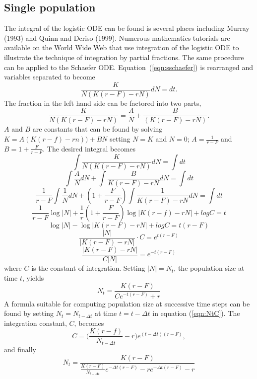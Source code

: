 \subsection{Single population}
The integral of the logistic ODE can be found is several places
including Murray (1993) and Quinn and Deriso (1999).
Numerous mathematics tutorials are available on the World Wide Web
that use
integration of the logistic ODE to illustrate the technique of
integration by partial fractions.
The same procedure can be applied to the Schaefer ODE.
Equation~(\ref{eqn:sschaefer}) is rearranged and variables
separated to become
\begin{equation}
\frac{K}{N(K(r-F)-rN)}dN=dt.
\end{equation}
The fraction in the left hand side can be factored into two parts,
\begin{equation}
\frac{K}{N(K(r-F)-rN)}=\frac{A}{N}+\frac{B}{(K(r-F)-rN)}.
\end{equation}
$A$ and $B$ are constants that can be found by solving
$K=A(K(r-f)-rn))+BN$
setting $N=K$ and $N=0$; 
$A=\frac{1}{r-F}$ and $B=1+\frac{F}{r-F}$.
The desired integral becomes
\[\int\frac{K}{N(K(r-F)-rN)}dN   = \int dt\]
\[\int\frac{A}{N}dN + \int\frac{B}{K(r-F)-rN}dN  = \int dt\]
\[\frac{1}{r-F}\int\frac{1}{N}dN + (1+\frac{F}{r-F})\int\frac{1}{K(r-F)-rN}dN  = \int dt\] 
\[\frac{1}{r-F}\log |N| + \frac{1}{r}(1+\frac{F}{r-F})\log |K(r-f)-rN| +log C  = t\] \[\log |N| - \log |K(r-F)-rN| + log C  = t(r-F)\]
\[\frac{|N|}{|K(r-F)-rN|}\cdot C  =  e^{t(r-F)}\]
\[\frac{|K(r-F)-rN|}{C|N|} =  e^{-t(r-F)}\]
where $C$ is the constant of integration.
Setting $|N| = N_t$, the population size at time $t$, yields
\begin{equation}
\label{eqn:NtC}
N_t=\frac{K(r-F)}{Ce^{-t(r-F)}+r}
\end{equation}
A formula suitable for computing population size at successive
time steps can be found by setting $N_t = N_{t-\Delta t}$ at time
$t=t-\Delta t$ in equation (\ref{eqn:NtC}).
The integration constant, $C$, becomes
\begin{equation}
C=\Bigg(\frac{K(r-f)}{N_{t-\Delta t}}-r\Bigg)e^{(t-\Delta t)(r-F)},
\end{equation}
and finally
\begin{equation}
\label{eqn:intschaefer}
N_t = \frac{K(r-F)}{\frac{K(r-F)}{N_{t-\Delta t}}e^{-\Delta t(r-F)}-re^{-\Delta t(r-F)} -r}
\end{equation}

